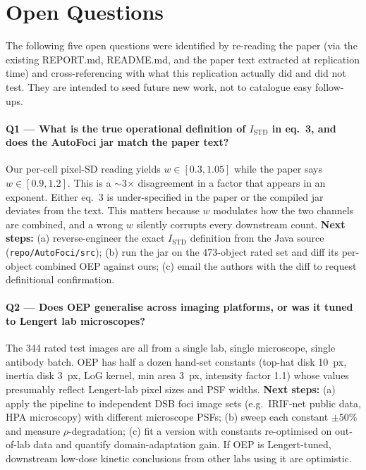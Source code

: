 \documentclass[11pt]{article}
\begin{document}
\section{Open Questions}
The following five open questions were identified by re-reading the paper (via the existing REPORT.md, README.md, and the paper text extracted at replication time) and cross-referencing with what this replication actually did and did not test. They are intended to seed future new work, not to catalogue easy follow-ups.

\paragraph{Q1 --- What is the true operational definition of $I_\mathrm{STD}$ in eq.~3, and does the AutoFoci jar match the paper text?} Our per-cell pixel-SD reading yields $w \in [0.3, 1.05]$ while the paper says $w \in [0.9, 1.2]$. This is a $\sim$3$\times$ disagreement in a factor that appears in an exponent. Either eq.~3 is under-specified in the paper or the compiled jar deviates from the text. This matters because $w$ modulates how the two channels are combined, and a wrong $w$ silently corrupts every downstream count. \textbf{Next steps:} (a) reverse-engineer the exact $I_\mathrm{STD}$ definition from the Java source (\texttt{repo/AutoFoci/src}); (b) run the jar on the 473-object rated set and diff its per-object combined OEP against ours; (c) email the authors with the diff to request definitional confirmation.

\paragraph{Q2 --- Does OEP generalise across imaging platforms, or was it tuned to Lengert lab microscopes?} The 344 rated test images are all from a single lab, single microscope, single antibody batch. OEP has half a dozen hand-set constants (top-hat disk 10~px, inertia disk 3~px, LoG kernel, min area 3~px, intensity factor 1.1) whose values presumably reflect Lengert-lab pixel sizes and PSF widths. \textbf{Next steps:} (a) apply the pipeline to independent DSB foci image sets (e.g.\ IRIF-net public data, HPA microscopy) with different microscope PSFs; (b) sweep each constant $\pm 50\%$ and measure $\rho$-degradation; (c) fit a version with constants re-optimised on out-of-lab data and quantify domain-adaptation gain. If OEP is Lengert-tuned, downstream low-dose kinetic conclusions from other labs using it are optimistic.
\end{document}

